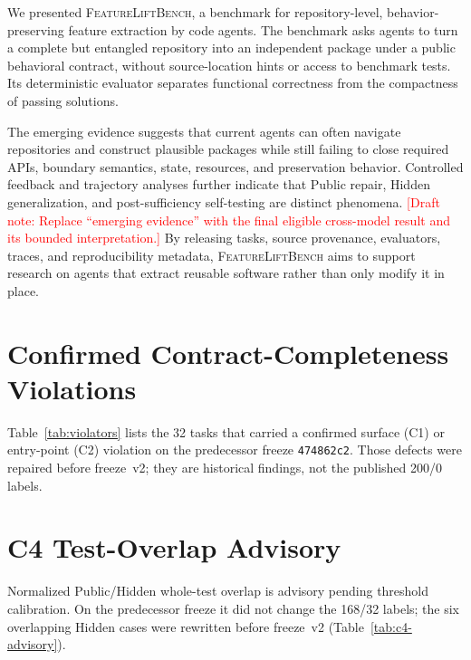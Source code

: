 \documentclass[acmsmall,anonymous,review,screen]{acmart}
\newcommand{\flb}{\textsc{FeatureLiftBench}\xspace}
\newcommand{\draftnote}[1]{\textcolor{red}{[Draft note: #1]}}
\begin{document}
We presented \flb, a benchmark for repository-level, behavior-preserving
feature extraction by code agents. The benchmark asks agents to turn a complete
but entangled repository into an independent package under a public behavioral
contract, without source-location hints or access to benchmark tests. Its
deterministic evaluator separates functional correctness from the compactness
of passing solutions.

The emerging evidence suggests that current agents can often navigate
repositories and construct plausible packages while still failing to close
required APIs, boundary semantics, state, resources, and preservation behavior.
Controlled feedback and trajectory analyses further indicate that Public
repair, Hidden generalization, and post-sufficiency self-testing are distinct
phenomena. \draftnote{Replace ``emerging evidence'' with the final eligible
cross-model result and its bounded interpretation.} By releasing tasks, source
provenance, evaluators, traces, and reproducibility metadata, \flb aims to
support research on agents that extract reusable software rather than only
modify it in place.






\appendix

\section{Confirmed Contract-Completeness Violations}
\label{app:violators}

Table~\ref{tab:violators} lists the 32 tasks that carried a confirmed
surface (C1) or entry-point (C2) violation on the predecessor freeze
\texttt{474862c2}. Those defects were repaired before freeze~v2; they are
historical findings, not the published 200/0 labels.



\section{C4 Test-Overlap Advisory}
\label{app:c4}

Normalized Public/Hidden whole-test overlap is advisory pending threshold
calibration. On the predecessor freeze it did not change the 168/32 labels;
the six overlapping Hidden cases were rewritten before freeze~v2
(Table~\ref{tab:c4-advisory}).
\end{document}
